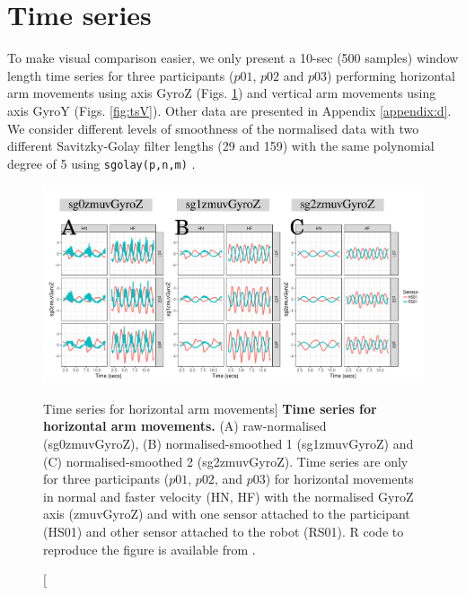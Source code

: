 \section{Time series}
To make visual comparison easier, we only present a 10-sec (500 samples) 
window length time series for three participants ($p01$, $p02$ and $p03$) 
performing horizontal 
arm movements using axis GyroZ (Figs. \ref{fig:tsH})
and  vertical arm movements using axis GyroY (Figs. \ref{fig:tsV}). 
Other data are presented in Appendix \ref{appendix:d}.
We consider different levels of smoothness of the normalised data 
with two different Savitzky-Golay filter lengths (29 and 159) 
with the same polynomial degree of 5 using \texttt{sgolay(p,n,m)} 
\citep{Rsignal}. 
\begin{figure}[!h]
  \centering
\includegraphics[width=1.0\textwidth]{fig_6_01}
    	\caption
	[Time series for horizontal arm movements]{
	{\bf Time series for horizontal arm movements.}
		(A) raw-normalised (sg0zmuvGyroZ), 
		(B) normalised-smoothed 1 (sg1zmuvGyroZ) and
		(C) normalised-smoothed 2 (sg2zmuvGyroZ).
		Time series are only for three participants 
		($p01$, $p02$, and $p03$) 
		for horizontal movements in normal and faster velocity (HN, HF) 
		with the normalised GyroZ axis (zmuvGyroZ) 
		and with one sensor attached to the participant (HS01) 
		and other sensor attached to the robot (RS01).	
	R code to reproduce the figure is available from \cite{xochicale2018}.
        }
    \label{fig:tsH}
\end{figure}
